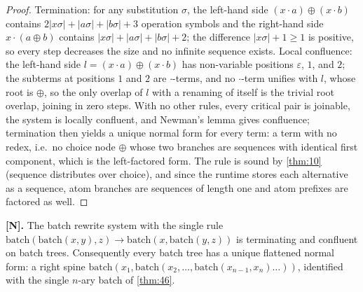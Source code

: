 \begin{proof}
Termination: for any substitution $\sigma$, the left-hand side
$(x \cdot a) \oplus (x \cdot b)$ contains $2|x\sigma| + |a\sigma| +
|b\sigma| + 3$ operation symbols and the right-hand side
$x \cdot (a \oplus b)$ contains $|x\sigma| + |a\sigma| + |b\sigma| + 2$;
the difference $|x\sigma| + 1 \geq 1$ is positive, so every step decreases
the size and no infinite sequence exists. Local confluence: the left-hand
side $l = (x \cdot a) \oplus (x \cdot b)$ has non-variable positions
$\varepsilon$, $1$, and $2$; the subterms at positions $1$ and $2$ are
$\cdot$-terms, and no $\cdot$-term unifies with $l$, whose root is $\oplus$,
so the only overlap of $l$ with a renaming of itself is the trivial root
overlap, joining in zero steps. With no other rules, every critical pair is
joinable, the system is locally confluent, and Newman's lemma gives
confluence; termination then yields a unique normal form for every term: a
term with no redex, i.e.\ no choice node $\oplus$ whose two branches are
sequences with identical first component, which is the left-factored form.
The rule is sound by \autoref{thm:10} (sequence distributes over choice),
and since the runtime stores each alternative as a sequence, atom branches
are sequences of length one and atom prefixes are factored as well.
\end{proof}

\begin{theorem}\label{thm:17}
\textbf{[N].} The batch rewrite system with the single rule
$\mathrm{batch} (\mathrm{batch} (x,y), z) \to
\mathrm{batch} (x, \mathrm{batch} (y,z))$ is terminating and confluent on
batch trees. Consequently every batch tree has a unique flattened normal
form: a right spine $\mathrm{batch} (x_1, \mathrm{batch} (x_2, \ldots,
\mathrm{batch} (x_{n-1}, x_n) \ldots))$, identified with the single $n$-ary
batch of \autoref{thm:46}.
\end{theorem}

